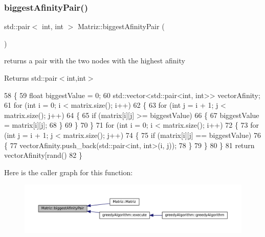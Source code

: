 \subsubsection{\texorpdfstring{biggest\+Afinity\+Pair()}{biggestAfinityPair()}}
{\footnotesize\ttfamily std\+::pair$<$ int, int $>$ Matriz\+::biggest\+Afinity\+Pair (\begin{DoxyParamCaption}{ }\end{DoxyParamCaption})}



returns a pair with the two nodes with the highest afinity 

\begin{DoxyReturn}{Returns}
std\+::pair$<$int,int$>$ 
\end{DoxyReturn}

\begin{DoxyCode}
58 \{
59   \textcolor{keywordtype}{float} biggestValue = 0;
60   std::vector<std::pair<int, int>> vectorAfinity;
61   \textcolor{keywordflow}{for} (\textcolor{keywordtype}{int} i = 0; i < matrix.size(); i++)
62   \{
63     \textcolor{keywordflow}{for} (\textcolor{keywordtype}{int} j = i + 1; j < matrix.size(); j++)
64     \{
65       \textcolor{keywordflow}{if} (matrix[i][j] >= biggestValue)
66       \{
67         biggestValue = matrix[i][j];
68       \}
69     \}
70   \}
71   \textcolor{keywordflow}{for} (\textcolor{keywordtype}{int} i = 0; i < matrix.size(); i++)
72   \{
73     \textcolor{keywordflow}{for} (\textcolor{keywordtype}{int} j = i + 1; j < matrix.size(); j++)
74     \{
75       \textcolor{keywordflow}{if} (matrix[i][j] == biggestValue)
76       \{
77         vectorAfinity.push\_back(std::pair<int, int>(i, j));
78       \}
79     \}
80   \}
81   \textcolor{keywordflow}{return} vectorAfinity[rand() %
82 \}
\end{DoxyCode}
Here is the caller graph for this function\+:\nopagebreak
\begin{figure}[H]
\begin{center}
\leavevmode
\includegraphics[width=350pt]{classMatriz_a30e8aba7a2868aaa98f11d3037ff8319_icgraph}
\end{center}
\end{figure}
\mbox{\label{classMatriz_ad6915f9b31f93230a3ce05d01d23a47b}} 
